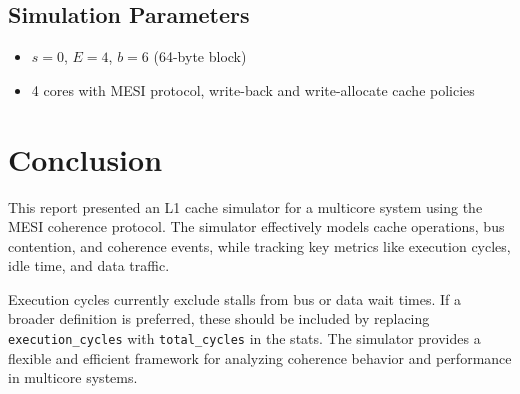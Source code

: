 \documentclass[a4paper,12pt]{article}
\begin{document}
\vspace{5pt}
\subsection*{Simulation Parameters}
\vspace{-3pt}
\begin{itemize}[noitemsep]
    \item $s = 0$, $E = 4$, $b = 6$ (64-byte block)
    \item 4 cores with MESI protocol, write-back and write-allocate cache policies
\end{itemize}

\section{Conclusion}

This report presented an L1 cache simulator for a multicore system using the MESI coherence protocol. The simulator effectively models cache operations, bus contention, and coherence events, while tracking key metrics like execution cycles, idle time, and data traffic.

Execution cycles currently exclude stalls from bus or data wait times. If a broader definition is preferred, these should be included by replacing \texttt{execution\_cycles} with \texttt{total\_cycles} in the stats. The simulator provides a flexible and efficient framework for analyzing coherence behavior and performance in multicore systems.
\end{document}
